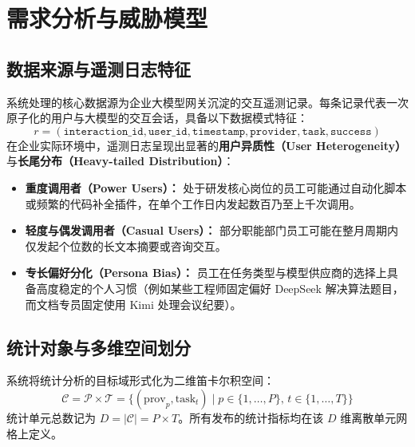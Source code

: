 \section{需求分析与威胁模型}
\label{sec:threat_model}

\subsection{数据来源与遥测日志特征}
系统处理的核心数据源为企业大模型网关沉淀的交互遥测记录。每条记录代表一次原子化的用户与大模型的交互会话，具备以下数据模式特征：
\begin{equation}
  r = (\texttt{interaction\_id}, \texttt{user\_id}, \texttt{timestamp}, \texttt{provider}, \texttt{task}, \texttt{success})
\end{equation}
在企业实际环境中，遥测日志呈现出显著的\textbf{用户异质性（User Heterogeneity）}与\textbf{长尾分布（Heavy-tailed Distribution）}：
\begin{itemize}[leftmargin=2em]
  \item \textbf{重度调用者（Power Users）：} 处于研发核心岗位的员工可能通过自动化脚本或频繁的代码补全插件，在单个工作日内发起数百乃至上千次调用。
  \item \textbf{轻度与偶发调用者（Casual Users）：} 部分职能部门员工可能在整月周期内仅发起个位数的长文本摘要或咨询交互。
  \item \textbf{专长偏好分化（Persona Bias）：} 员工在任务类型与模型供应商的选择上具备高度稳定的个人习惯（例如某些工程师固定偏好 DeepSeek 解决算法题目，而文档专员固定使用 Kimi 处理会议纪要）。
\end{itemize}

\subsection{统计对象与多维空间划分}
系统将统计分析的目标域形式化为二维笛卡尔积空间：
\begin{equation}
  \mathcal{C} = \mathcal{P} \times \mathcal{T} = \{ (\text{prov}_p, \text{task}_t) \mid p \in \{1, \dots, P\}, \, t \in \{1, \dots, T\} \}
\end{equation}
统计单元总数记为 $D = |\mathcal{C}| = P \times T$。所有发布的统计指标均在该 $D$ 维离散单元网格上定义。

